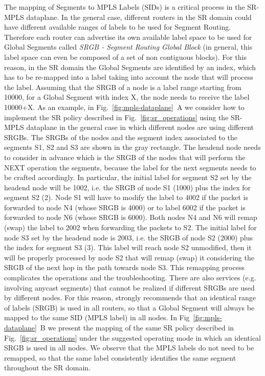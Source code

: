 The mapping of Segments to MPLS Labels (SIDs) is a critical process in the SR-MPLS dataplane. In the general case, different routers in the SR domain could have different available ranges of labels to be used for Segment Routing. Therefore each router can advertise its own available label space to be used for Global Segments called \textit{SRGB - Segment Routing Global Block} (in general, this label space can even be composed of a set of non contiguous blocks). For this reason, in the SR domain the Global Segments are identified by an index, which has to be re-mapped into a label taking into account the node that will process the label. Assuming that the SRGB of a node is a label range starting from 10000, for a Global Segment with index X, the node needs to receive the label 10000+X. As an example, in Fig.~\ref{fig:mpls-dataplane}~A we consider how to implement the SR policy described in Fig.~\ref{fig:sr_operations} using the SR-MPLS dataplane in the general case in which different nodes are using different SRGBs. The SRGBs of the nodes and the segment index associated to the segments S1, S2 and S3 are shown in the gray rectangle. The headend node needs to consider in advance which is the SRGB of the nodes that will perform the NEXT operation the segments, because the label for the next segments needs to be crafted accordingly. In particular, the initial label for segment S2 set by the headend node will be 1002, i.e. the SRGB of node S1 (1000) plus the index for segment S2 (2). Node S1 will have to modify the label to 4002 if the packet is forwarded to node N4 (whose SRGB is 4000) or to label 6002 if the packet is forwarded to node N6 (whose SRGB is 6000). Both nodes N4 and N6 will remap (swap) the label to 2002 when forwarding the packets to S2. The initial label for node S3 set by the headend node is 2003, i.e. the SRGB of node S2 (2000) plus the index for segment S3 (3). This label will reach node S2 unmodified, then it will be properly processed by node S2 that will remap (swap) it considering the SRGB of the next hop in the path towards node S3. This remapping process complicates the operations and the troubleshooting. There are also services (e.g. involving anycast segments) that cannot be realized if different SRGBs are used by different nodes. For this reason, \cite{rfc8402} strongly recommends that an identical range of labels (SRGB) is used in all routers, so that a Global Segment will always be mapped to the same SID (MPLS label) in all nodes. In Fig~\ref{fig:mpls-dataplane}~B we present the mapping of the same SR policy described in Fig.~\ref{fig:sr_operations} under the suggested operating mode in which an identical SRGB is used in all nodes. We observe that the MPLS labels do not need to be remapped, so that the same label consistently identifies the same segment throughout the SR domain.

